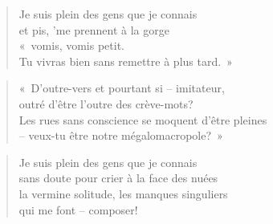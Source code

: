   \begin{verse}
    Je suis plein des gens que je connais\\
    et pis, ’me prennent à la gorge\\
    «~vomis, vomis petit.\\
    Tu vivras bien sans remettre à plus tard.~»
  \end{verse}
  \begin{verse}
    «~D’outre-vers et pourtant si -- imitateur,\\
    outré d’être l’outre des crève-mots?\\
    Les rues sans conscience se moquent d’être pleines\\
    -- veux-tu être notre mégalomacropole?~»
  \end{verse}
  \begin{verse}
    Je suis plein des gens que je connais\\
    sans doute pour crier à la face des nuées\\
    la vermine solitude, les manques singuliers\\
    qui me font -- composer!
  \end{verse}

